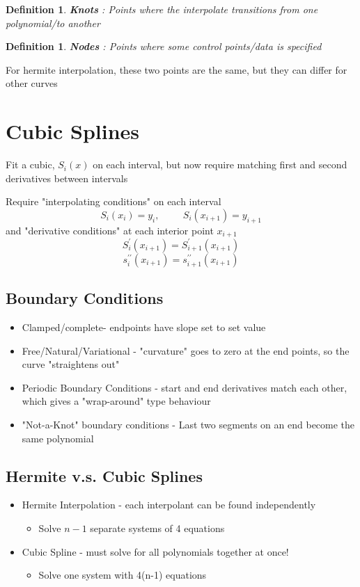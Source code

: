 \documentclass[twoside]{article}
\newtheorem{definition}[theorem]{Definition}
\begin{document}
\begin{definition}
\textbf{Knots} : Points where the interpolate transitions from one polynomial/to another
\end{definition}
\begin{definition}
\textbf{Nodes} : Points where some control points/data is  specified
\end{definition}

For hermite interpolation, these two points are the same, but they can differ for other curves

\section{Cubic Splines}
Fit a cubic, \(S_i(x)\) on each interval, but now require matching first and second derivatives between intervals

Require "interpolating conditions" on each interval
$$ S_i(x_i) = y_i, \hspace{1cm} S_i(x_{i+1}) = y_{i+1} $$
and "derivative conditions" at each interior point \(x_{i+1}\) 
$$ S_i^\prime(x_{i+1}) = S_{i+1}^\prime(x_{i+1})$$
$$ s_i^{\prime\prime} (x_{i+1}) = s_{i+1}^{\prime\prime} (x_{i+1})$$

\subsection{Boundary Conditions}
\begin{itemize}
\item Clamped/complete- endpoints have slope set to set value
\item Free/Natural/Variational - "curvature" goes to zero at the end points, so the curve "straightens out"
\item Periodic Boundary Conditions - start and end derivatives match each other, which gives a "wrap-around" type behaviour 
\item "Not-a-Knot" boundary conditions - Last two segments on an end become the same polynomial
\end{itemize}

\subsection{Hermite v.s. Cubic Splines}
\begin{itemize}
\item Hermite Interpolation - each interpolant can be found independently
\begin{itemize}
\item Solve \(n-1\) separate systems of 4 equations
\end{itemize}
\item Cubic Spline - must solve for all polynomials together at once!
\begin{itemize}
\item Solve one system with 4(n-1) equations
\end{itemize}

\end{itemize}
\end{document}
